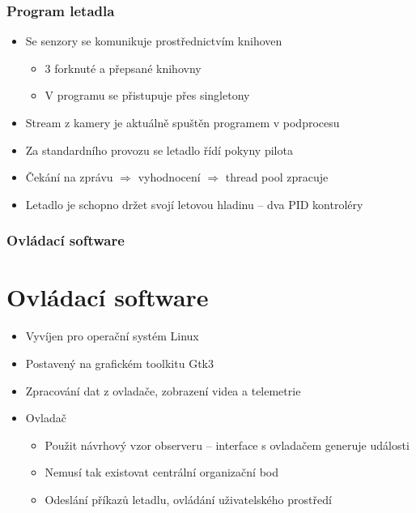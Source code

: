 \documentclass[aspectratio=43]{beamer}
\begin{document}
\begin{frame}[fragile]
	\frametitle{Program letadla}
	\begin{itemize}
		\item Se senzory se komunikuje prostřednictvím knihoven
			\begin{itemize}
				\item 3 forknuté a přepsané knihovny
				\item V programu se přistupuje přes singletony
			\end{itemize}
		\item Stream z kamery je aktuálně spuštěn programem v podprocesu
		\item Za standardního provozu se letadlo řídí pokyny pilota
		\item Čekání na zprávu $\Rightarrow$ vyhodnocení $\Rightarrow$ thread pool zpracuje
		\item Letadlo je schopno držet svojí letovou hladinu -- dva PID kontroléry
	\end{itemize}
\end{frame}

\begin{frame}[fragile]
	\frametitle{Ovládací software}
	\section{Ovládací software}
	\begin{itemize}
		\item Vyvíjen pro operační systém Linux
		\item Postavený na grafickém toolkitu Gtk3
		\item Zpracování dat z ovladače, zobrazení videa a telemetrie
		\item Ovladač
			\begin{itemize}
				\item Použit návrhový vzor observeru -- interface s ovladačem generuje události
				\item Nemusí tak existovat centrální organizační bod
				\item Odeslání příkazů letadlu, ovládání uživatelského prostředí
			\end{itemize}
	\end{itemize}
\end{frame}
\end{document}
